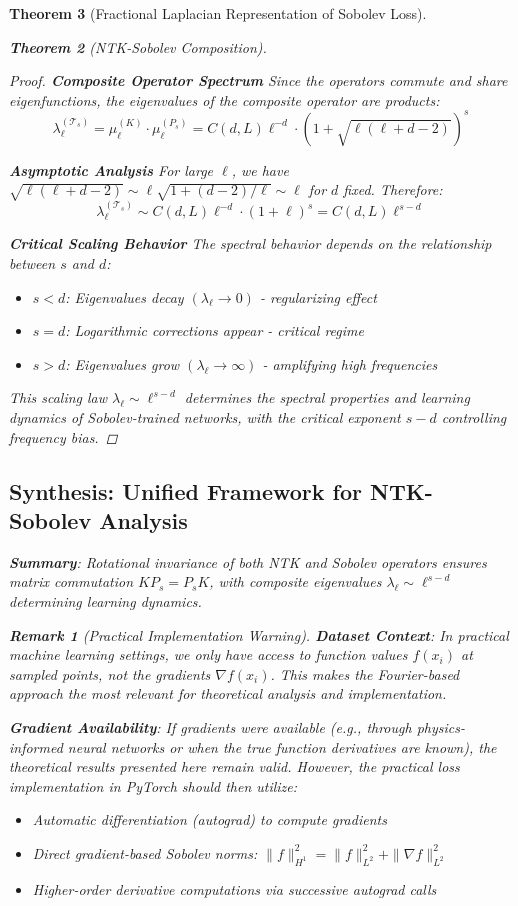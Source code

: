 \documentclass{article}
\newtheorem{theorem}{Theorem}[section]
\newtheorem{remark}[theorem]{Remark}
\begin{document}
\begin{theorem}[Fractional Laplacian Representation of Sobolev Loss]
\begin{theorem}[NTK-Sobolev Composition]
\begin{proof}
\textbf{Composite Operator Spectrum}
Since the operators commute and share eigenfunctions, the eigenvalues of the composite operator are products:
\[ \lambda_\ell^{(\mathcal{T}_s)} = \mu_\ell^{(K)} \cdot \mu_\ell^{(P_s)} = C(d, L) \ell^{-d} \cdot (1 + \sqrt{\ell(\ell + d - 2)})^s \]

\textbf{Asymptotic Analysis}
For large $\ell$, we have $\sqrt{\ell(\ell + d - 2)} \sim \ell \sqrt{1 + (d-2)/\ell} \sim \ell$ for $d$ fixed. Therefore:
\[ \lambda_\ell^{(\mathcal{T}_s)} \sim C(d, L) \ell^{-d} \cdot (1 + \ell)^s = C(d, L) \ell^{s-d} \]

\textbf{Critical Scaling Behavior}
The spectral behavior depends on the relationship between $s$ and $d$:
\begin{itemize}
\item $s < d$: Eigenvalues decay $(\lambda_\ell \to 0)$ - regularizing effect
\item $s = d$: Logarithmic corrections appear - critical regime  
\item $s > d$: Eigenvalues grow $(\lambda_\ell \to \infty)$ - amplifying high frequencies
\end{itemize}

This scaling law $\lambda_\ell \sim \ell^{s-d}$ determines the spectral properties and learning dynamics of Sobolev-trained networks, with the critical exponent $s - d$ controlling frequency bias.
\end{proof}

\subsection{Synthesis: Unified Framework for NTK-Sobolev Analysis}

\textbf{Summary}: Rotational invariance of both NTK and Sobolev operators ensures matrix commutation $KP_s = P_sK$, with composite eigenvalues $\lambda_\ell \sim \ell^{s-d}$ determining learning dynamics.

\begin{remark}[Practical Implementation Warning]
\textbf{Dataset Context}: In practical machine learning settings, we only have access to function values $f(x_i)$ at sampled points, \emph{not} the gradients $\nabla f(x_i)$. This makes the Fourier-based approach the most relevant for theoretical analysis and implementation.

\textbf{Gradient Availability}: If gradients were available (e.g., through physics-informed neural networks or when the true function derivatives are known), the theoretical results presented here remain valid. However, the practical loss implementation in PyTorch should then utilize:
\begin{itemize}
\item Automatic differentiation (autograd) to compute gradients
\item Direct gradient-based Sobolev norms: $\|f\|_{H^1}^2 = \|f\|_{L^2}^2 + \|\nabla f\|_{L^2}^2$
\item Higher-order derivative computations via successive autograd calls
\end{itemize}


\end{remark}
\end{theorem}
\end{theorem}
\end{document}
